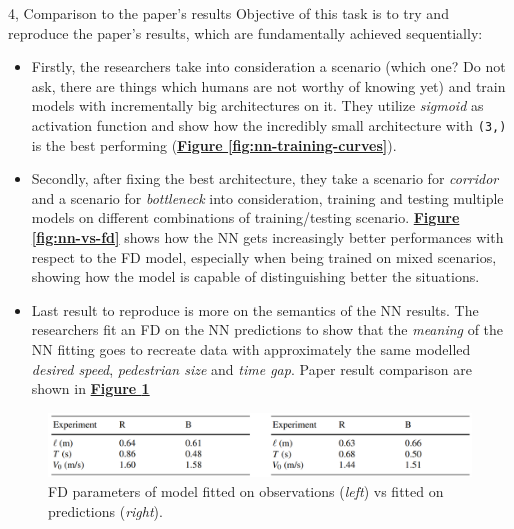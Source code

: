 \documentclass[10pt,a4paper]{article}
\begin{document}
\begin{task}{4, Comparison to the paper's results}
Objective of this task is to try and reproduce the paper's results, which are fundamentally achieved sequentially:
\begin{itemize}
    \item Firstly, the researchers take into consideration a scenario (which one? Do not ask, there are things which humans are not worthy of knowing yet) and train models with incrementally big architectures on it. They utilize \textit{sigmoid} as activation function and show how the incredibly small architecture with \texttt{(3,)} is the best performing (\textbf{\hyperref[fig:nn-training-curves]{Figure \ref{fig:nn-training-curves}}}). 
    \item Secondly, after fixing the best architecture, they take a scenario for \textit{corridor} and a scenario for \textit{bottleneck} into consideration, training and testing multiple models on different combinations of training/testing scenario. \textbf{\hyperref[fig:nn-vs-fd]{Figure \ref{fig:nn-vs-fd}}} shows how the NN gets increasingly better performances with respect to the FD model, especially when being trained on mixed scenarios, showing how the model is capable of distinguishing better the situations.
    \item Last result to reproduce is more on the semantics of the NN results. The researchers fit an FD on the NN predictions to show that the \textit{meaning} of the NN fitting goes to recreate data with approximately the same modelled \textit{desired speed}, \textit{pedestrian size} and \textit{time gap}. Paper result comparison are shown in \textbf{\hyperref[fig:fd-parameters]{Figure \ref{fig:fd-parameters}}}
\end{itemize}
\begin{figure}[h]
    \centering
    \includegraphics[scale=0.5]{images/fd_parameters.png}
    \caption{FD parameters of model fitted on observations (\textit{left}) vs fitted on predictions (\textit{right}).}
    \label{fig:fd-parameters}
\end{figure}


\end{task}
\end{document}

